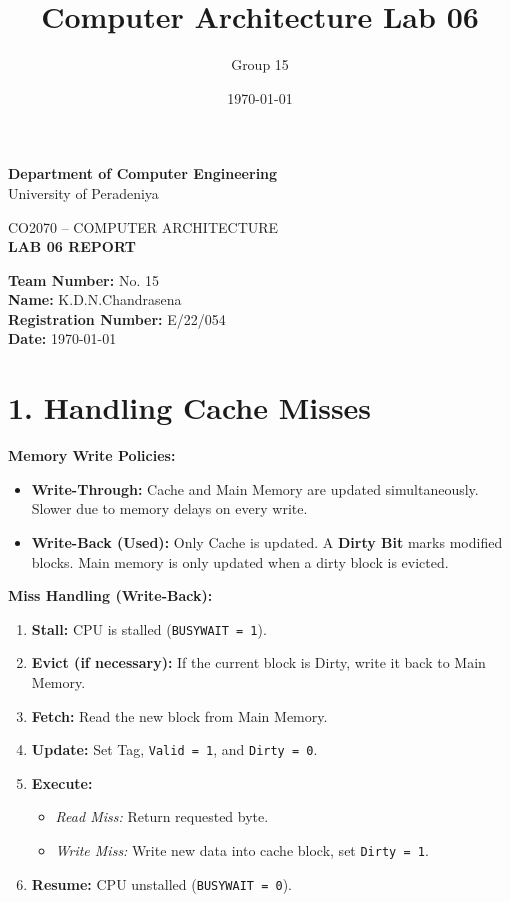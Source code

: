 \documentclass[12pt,a4paper]{article}
\title{Computer Architecture Lab 06}
\author{Group 15}
\date{\today}
\begin{document}
\begin{center}
{\Large \textbf{Department of Computer Engineering}}\\
\vspace{0.2cm}
{\large University of Peradeniya}\\
\vspace{0.6cm}

{\large CO2070 -- COMPUTER ARCHITECTURE}\\
\vspace{0.3cm}
{\Large \textbf{LAB 06 REPORT}}\\
\vspace{0.2cm}

\end{center}
{\large
\textbf{Team Number:} No. 15\\[0.3cm]
\textbf{Name:} K.D.N.Chandrasena\\[0.3cm]
\textbf{Registration Number:} E/22/054\\[0.3cm]
\textbf{Date:} \today
}

\vspace{1cm}

\section*{1. Handling Cache Misses}

\textbf{Memory Write Policies:}
\begin{itemize}
    \item \textbf{Write-Through:} Cache and Main Memory are updated simultaneously. Slower due to memory delays on every write.
    \item \textbf{Write-Back (Used):} Only Cache is updated. A \textbf{Dirty Bit} marks modified blocks. Main memory is only updated when a dirty block is evicted.
\end{itemize}

\textbf{Miss Handling (Write-Back):}
\begin{enumerate}
    \item \textbf{Stall:} CPU is stalled (\texttt{BUSYWAIT = 1}).
    \item \textbf{Evict (if necessary):} If the current block is Dirty, write it back to Main Memory.
    \item \textbf{Fetch:} Read the new block from Main Memory.
    \item \textbf{Update:} Set Tag, \texttt{Valid = 1}, and \texttt{Dirty = 0}.
    \item \textbf{Execute:} 
        \begin{itemize}
            \item \textit{Read Miss:} Return requested byte.
            \item \textit{Write Miss:} Write new data into cache block, set \texttt{Dirty = 1}.
        \end{itemize}
    \item \textbf{Resume:} CPU unstalled (\texttt{BUSYWAIT = 0}).
\end{enumerate}
\end{document}

